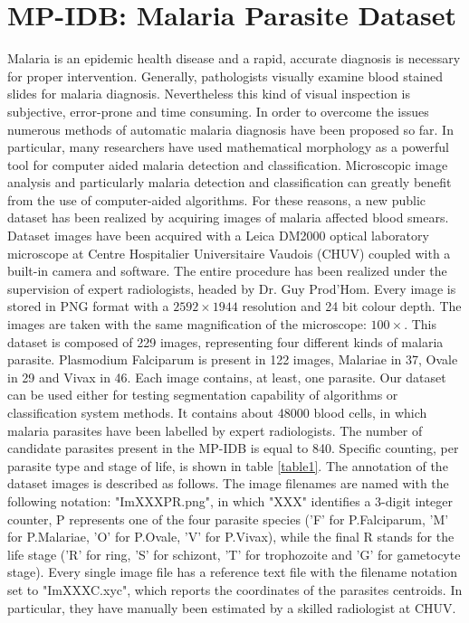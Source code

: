 \documentclass[final,a4paper,12pt,english]{UnicaPhdThesis3}
\begin{document}
\section{MP-IDB: Malaria Parasite Dataset}
Malaria is an epidemic health disease and a rapid, accurate diagnosis is necessary for proper intervention. Generally, pathologists visually examine blood stained slides for malaria diagnosis. 
Nevertheless this kind of visual inspection is subjective, error-prone and time consuming. In order to overcome the issues numerous methods of automatic malaria diagnosis have been proposed so far. In particular, many researchers have used mathematical morphology as a powerful tool for computer aided malaria detection and classification.
Microscopic image analysis and particularly malaria detection and classification can greatly benefit from the use of computer-aided algorithms. For these reasons, a new public dataset has been realized by acquiring images of malaria affected blood smears.
Dataset images have been acquired with a Leica DM2000 optical laboratory microscope at Centre Hospitalier Universitaire Vaudois (CHUV) coupled with a built-in camera and software. The entire procedure has been realized under the supervision of expert radiologists, headed by Dr. Guy Prod'Hom. Every image is stored in PNG format with a $2592\times1944$ resolution and 24 bit colour depth. The images are taken with the same magnification of the microscope: $100\times$.
This dataset is composed of 229 images, representing four different kinds of malaria parasite. Plasmodium Falciparum is present in 122 images, Malariae in 37, Ovale in 29 and Vivax in 46. Each image contains, at least, one parasite. Our dataset can be used either for testing segmentation capability of algorithms or classification system methods. 
It contains about 48000 blood cells, in which malaria parasites have been labelled by expert radiologists. The number of candidate parasites present in the MP-IDB is equal to 840. Specific counting, per parasite type and stage of life, is shown in table \ref{table1}.
The annotation of the dataset images is described as follows. The image filenames are named with the following notation: "ImXXXPR.png", in which "XXX" identifies a 3-digit integer counter, P represents one of the four parasite species ('F' for P.Falciparum, 'M' for P.Malariae, 'O' for P.Ovale, 'V' for P.Vivax), while the final R stands for the life stage ('R' for ring, 'S' for schizont, 'T' for trophozoite and 'G' for gametocyte stage). Every single image file has a reference text file with the filename notation set to "ImXXXC.xyc", which reports the coordinates of the parasites centroids. In particular, they have manually been estimated by a skilled radiologist at CHUV. 
\end{document}
